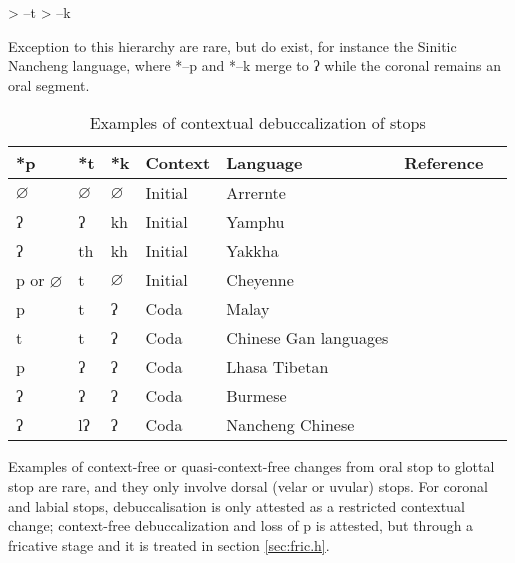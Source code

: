 \documentclass[oldfontcommands,oneside,a4paper,11pt]{article}
\newcommand{\ipa}[1]{{\phon \mbox{#1}}} %
\newcommand{\grise}[1]{\cellcolor{lightgray}\textbf{#1}}
\begin{document}
\begin{exe}
\ex \label{ex:hierarchy.coda}
\glt \ipa{--p} >  \ipa{--t} >  \ipa{--k}
\end{exe}
Exception to this hierarchy are rare, but do exist, for instance the Sinitic Nancheng language, where *--\ipa{p} and *--\ipa{k} merge to \ipa{ʔ} while the coronal remains an oral segment.
\begin{table}[h]
\caption{Examples of contextual debuccalization of stops} \label{tab:debucc.context}
\begin{tabular}{lllllll}
\toprule
*p & *t & *k & Context & Language    & Reference \\
\midrule
$\varnothing$ \grise{}&$\varnothing$ \grise{}& $\varnothing$ \grise{}&Initial& Arrernte &\citet{koch06arandic}\\
\ipa{ʔ} \grise{}&\ipa{ʔ} \grise{}& \ipa{kh} &Initial& Yamphu  & \citet[12-3]{opgenort05jero}\\
\ipa{ʔ} \grise{}&\ipa{th} & \ipa{kh} & Initial&Yakkha   & \\
\ipa{p} or $\varnothing$ &\ipa{t}  & $\varnothing$ \grise{}&Initial& Cheyenne &\citet{goddard88cheyenne.y}\\
\midrule
\ipa{p} &\ipa{t} & \ipa{ʔ}\grise{} & Coda &Malay   &   \\
\ipa{t} &\ipa{t} & \ipa{ʔ}\grise{} & Coda &Chinese Gan languages  &  \citet[123]{chinese.atlas08}  \\
\ipa{p} &\ipa{ʔ} \grise{}& \ipa{ʔ}\grise{} & Coda&Lhasa Tibetan   & \\
\ipa{ʔ} \grise{}&\ipa{ʔ} \grise{}& \ipa{ʔ}\grise{} & Coda& Burmese  & \\
\ipa{ʔ} \grise{}&\ipa{lʔ}& \ipa{ʔ}\grise{} & Coda& Nancheng Chinese& \citet[123]{chinese.atlas08}\\
\bottomrule
\end{tabular}
\end{table}




Examples of context-free or quasi-context-free changes from oral stop to glottal stop are rare, and they only involve dorsal (velar or uvular) stops. For coronal and labial stops, debuccalisation is only attested as a restricted contextual change; context-free debuccalization and loss of \ipa{p} is attested, but through a  fricative stage and it is treated in section \ref{sec:fric.h}. 
\end{document}
